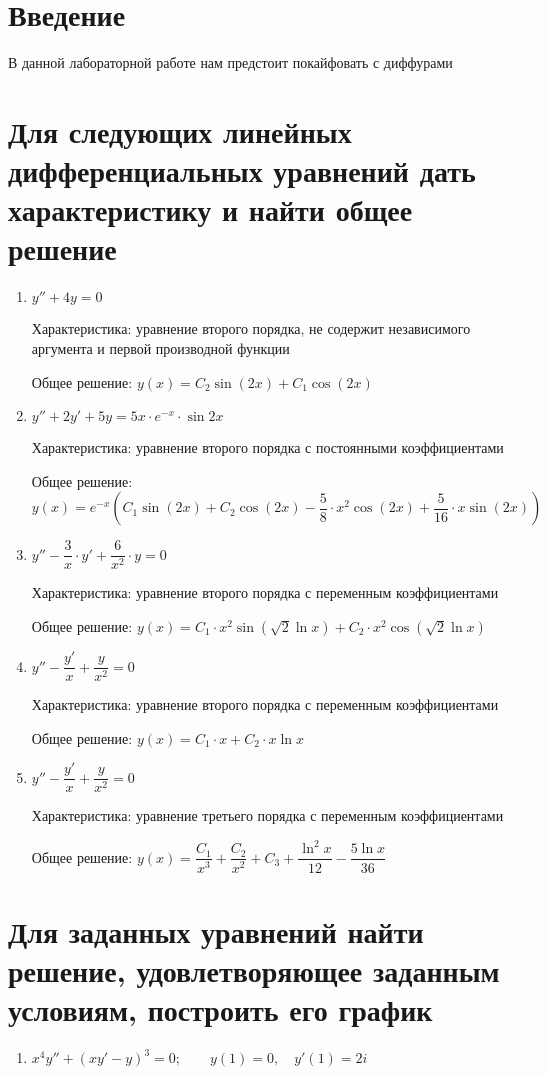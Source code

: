 \documentclass[14pt, a4paper]{extarticle}
\begin{document}
	
	\tableofcontents
	\pagebreak
	
	\section{Введение}
		В данной лабораторной работе нам предстоит покайфовать с диффурами
		\pagebreak
		
	\section{Для следующих линейных дифференциальных уравнений дать характеристику и найти общее решение}
		\begin{enumerate}
			\item \(y'' +4y = 0\)
			
				Характеристика: уравнение второго порядка, не содержит независимого аргумента и первой производной функции
				
				Общее решение: \(y (x) = C_2\sin{(2x)} + C_1\cos{(2x)}\)
				
			\item \(y'' + 2y' + 5y = 5x \cdot e^{-x} \cdot  \sin{2x}\)
			
				Характеристика: уравнение второго порядка с постоянными коэффициентами
			
				Общее решение: \[y (x) = e^{-x} \left(C_1\sin{(2x)} + C_2\cos{(2x)} - \dfrac{5}{8} \cdot x^2 \cos{(2x)} + \dfrac{5}{16} \cdot x \sin{(2x)}\right)\]
				
			\item \(y'' - \dfrac{3}{x} \cdot y' + \dfrac{6}{x^2} \cdot y = 0\)
			
				Характеристика: уравнение второго порядка с переменным коэффициентами
			
				Общее решение: \(y(x) = C_1 \cdot x^2 \sin{(\sqrt{2} \ln{x})} + C_2 \cdot x^2 \cos{(\sqrt{2} \ln{x})}\)
				
			\item \(y'' - \dfrac{y'}{x} + \dfrac{y}{x^2} = 0\)
			
				Характеристика: уравнение второго порядка с переменным коэффициентами
			
				Общее решение: \(y(x) = C_1 \cdot x + C_2 \cdot x \ln{x}\)
				
			\item \(y'' - \dfrac{y'}{x} + \dfrac{y}{x^2} = 0\)
			
				Характеристика: уравнение третьего порядка с переменным коэффициентами
			
				Общее решение: \(y(x) = \dfrac{C_1}{x^3} + \dfrac{C_2}{x^2} + C_3 + \dfrac{\ln^2{x}}{12} - \dfrac{5\ln{x}}{36}\)
		\end{enumerate}
		\pagebreak
			
	\section{Для заданных уравнений найти решение, удовлетворяющее заданным условиям, построить его график}
		\begin{enumerate}
			\item \(x^4 y'' + \left(xy' - y\right)^3 = 0; \qquad y(1) = 0, \quad y'(1) = 2i\)
		\end{enumerate}
\end{document}
